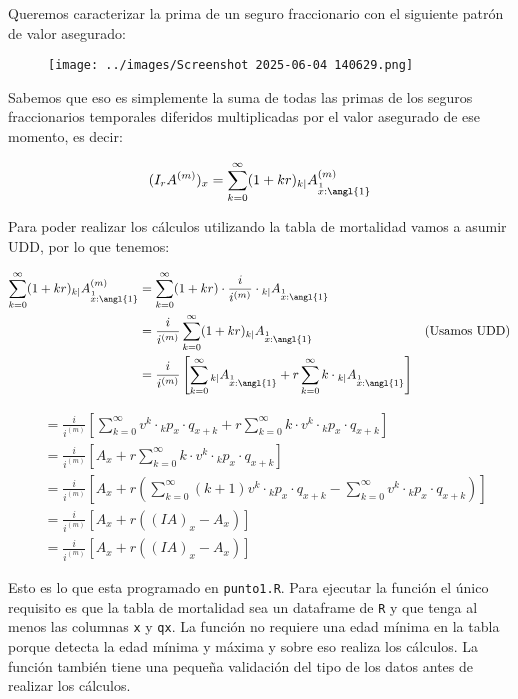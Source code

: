 Queremos caracterizar la prima de un seguro fraccionario con el siguiente patrón de valor asegurado:

\begin{figure}[H]
    \centering
    \texttt{[image: ../images/Screenshot 2025-06-04 140629.png]}
\end{figure}

Sabemos que eso es simplemente la suma de todas las primas de los seguros fraccionarios temporales diferidos multiplicadas por el valor asegurado de ese momento, es decir: 

\begin{equation*}
    (I_rA^{(m)})_x = \sum_{k=0}^\infty (1 + kr) {}_{k|}A^{(m)}_{\overset{1}{x}:\angl{1}}
\end{equation*}

Para poder realizar los cálculos utilizando la tabla de mortalidad vamos a asumir UDD, por lo que tenemos:

\begin{align*}
    \sum_{k=0}^\infty (1 + kr) {}_{k|}A^{(m)}_{\overset{1}{x}:\angl{1}} &= \sum_{k=0}^\infty (1 + kr) \cdot \frac{i}{i^{(m)}} \cdot {}_{k|}A_{\overset{1}{x}:\angl{1}} \\
    &= \frac{i}{i^{(m)}} \sum_{k=0}^\infty (1 + kr) {}_{k|}A_{\overset{1}{x}:\angl{1}} & \text{(Usamos UDD)}\\
    &= \frac{i}{i^{(m)}} \left[ \sum_{k=0}^\infty {}_{k|}A_{\overset{1}{x}:\angl{1}} + r \sum_{k=0}^\infty k \cdot {}_{k|}A_{\overset{1}{x}:\angl{1}} \right] \\
\end{align*}

\begin{align*}
    &= \frac{i}{i^{(m)}} \left[ \sum_{k=0}^\infty v^k \cdot {}_{k}p_x \cdot q_{x+k} + r \sum_{k=0}^\infty k \cdot v^k \cdot {}_{k}p_x \cdot q_{x+k} \right] \\
    &= \frac{i}{i^{(m)}} \left[ A_x + r \sum_{k=0}^\infty k \cdot v^k \cdot {}_{k}p_x \cdot q_{x+k} \right] \\
    &= \frac{i}{i^{(m)}} \left[ A_x + r \left( \sum_{k=0}^\infty (k+1) v^k \cdot {}_{k}p_x \cdot q_{x+k} - \sum_{k=0}^\infty v^k \cdot {}_{k}p_x \cdot q_{x+k} \right) \right] \\
    &= \frac{i}{i^{(m)}} \left[ A_x + r \left( (IA)_x - A_x \right) \right] \\
    &= \frac{i}{i^{(m)}} [A_x + r((IA)_x - A_x)]
\end{align*}

Esto es lo que esta programado en \texttt{punto1.R}. Para ejecutar la función el único requisito es que la tabla de mortalidad sea un dataframe de \texttt{R} y que tenga al menos las columnas \texttt{x} y \texttt{qx}. La función no requiere una edad mínima en la tabla porque detecta la edad mínima y máxima y sobre eso realiza los cálculos. La función también tiene una pequeña validación del tipo de los datos antes de realizar los cálculos.
